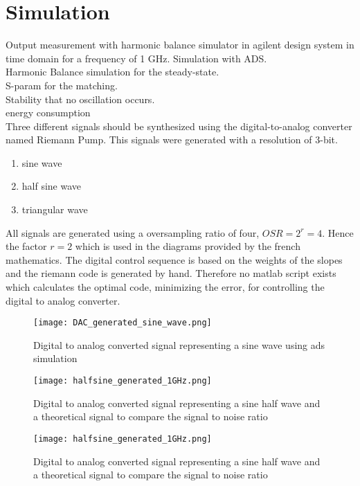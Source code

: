 \chapter{Simulation}
Output measurement with harmonic balance simulator in agilent design system in time domain for a frequency of 1 GHz.
Simulation  with ADS. \\Harmonic Balance simulation for the steady-state.\\ S-param for the matching.\\ Stability that no oscillation occurs. \\ energy consumption\\

Three different signals should be synthesized using the digital-to-analog converter named Riemann Pump. This signals were generated with a resolution of 3-bit. 
\begin{enumerate}
	\item sine wave
	\item half sine wave
	\item triangular wave
\end{enumerate}
All signals are generated using a oversampling ratio of four, $OSR = 2^{r} = 4$. Hence the factor $r = 2$ which is used in the diagrams provided by the french mathematics. The digital control sequence is based on the weights of the slopes and the riemann code is generated by hand. Therefore no matlab script exists which calculates the optimal code, minimizing the error, for controlling the digital to analog converter. 

\begin{figure}[ht]
	\centering
  \texttt{[image: DAC\_generated\_sine\_wave.png]}
	\caption{Digital to analog converted signal representing a sine wave using ads simulation}
	\label{DAC_generated_sine_wave}
\end{figure}

\begin{figure}[ht]
	\centering
  \texttt{[image: halfsine\_generated\_1GHz.png]}
	\caption{Digital to analog converted signal representing a sine half wave and a theoretical signal to compare the signal to noise ratio}
	\label{halfsine}
\end{figure}

\begin{figure}[ht]
	\centering
  \texttt{[image: halfsine\_generated\_1GHz.png]}
	\caption{Digital to analog converted signal representing a sine half wave and a theoretical signal to compare the signal to noise ratio}
	\label{halfsine}
\end{figure}